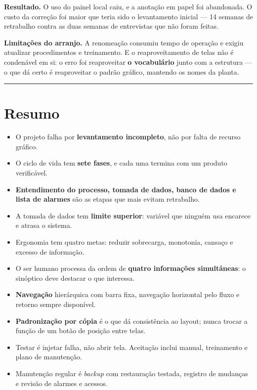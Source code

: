 \textbf{Resultado.} O uso do painel local caiu, e a anotação em papel foi abandonada. O custo da correção
foi maior que teria sido o levantamento inicial --- 14 semanas de retrabalho contra as duas semanas de
entrevistas que não foram feitas.

\textbf{Limitações do arranjo.} A renomeação consumiu tempo de operação e exigiu atualizar procedimentos e
treinamento. E o reaproveitamento de telas não é condenável em si: o erro foi reaproveitar \textbf{o
vocabulário} junto com a estrutura --- o que dá certo é reaproveitar o padrão gráfico, mantendo os
nomes da planta.

\begin{center}\rule{0.5\linewidth}{0.5pt}\end{center}

\section{Resumo}\label{resumo}

\begin{itemize}
\tightlist
\item
  O projeto falha por \textbf{levantamento incompleto}, não por falta de recurso gráfico.
\item
  O ciclo de vida tem \textbf{sete fases}, e cada uma termina com um produto verificável.
\item
  \textbf{Entendimento do processo, tomada de dados, banco de dados e lista de alarmes} são as etapas que mais evitam retrabalho.
\item
  A tomada de dados tem \textbf{limite superior}: variável que ninguém usa encarece e atrasa o sistema.
\item
  Ergonomia tem quatro metas: reduzir sobrecarga, monotonia, cansaço e excesso de informação.
\item
  O ser humano processa da ordem de \textbf{quatro informações simultâneas}: o sinóptico deve destacar o que interessa.
\item
  \textbf{Navegação} hierárquica com barra fixa, navegação horizontal pelo fluxo e retorno sempre disponível.
\item
  \textbf{Padronização por cópia} é o que dá consistência ao layout; nunca trocar a função de um botão de posição entre telas.
\item
  Testar é injetar falha, não abrir tela. Aceitação inclui manual, treinamento e plano de manutenção.
\item
  Manutenção regular é \emph{backup} com restauração testada, registro de mudanças e revisão de alarmes e acessos.
\end{itemize}

